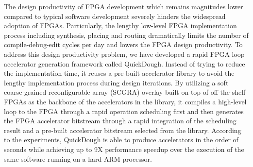 The design productivity of FPGA development which remains magnitudes lower compared to typical software development severely hinders the widespread adoption of FPGAs. Particularly, the lengthy low-level FPGA implementation process including synthesis, placing and routing dramatically limits the number of compile-debug-edit cycles per day and lowers the FPGA design productivity. To address this design productivity problem, we have developed a rapid FPGA loop accelerator generation framework called QuickDough. Instead of trying to reduce the implementation time, it reuses a pre-built accelerator library to avoid the lengthy implementation process during design iterations. By utilizing a soft coarse-grained reconfigurable array (SCGRA) overlay built on top of off-the-shelf FPGAs as the backbone of the accelerators in the library, it compiles a high-level loop to the FPGA through a rapid operation scheduling first and then generates the FPGA accelerator bitstream through a rapid integration of the scheduling result and a pre-built accelerator bitstream selected from the library. According to the experiments, QuickDough is able to produce accelerators in the order of seconds while achieving up to 9X performance speedup over the execution of the same software running on a hard ARM processor.  
